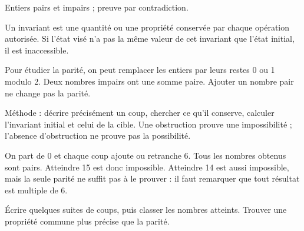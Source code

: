 \documentclass[11pt]{article}
\begin{document}
Entiers pairs et impairs ; preuve par contradiction.\par
{}
Un invariant est une quantité ou une propriété conservée par chaque opération autorisée. Si l’état visé n’a pas la même valeur de cet invariant que l’état initial, il est inaccessible.\par
Pour étudier la parité, on peut remplacer les entiers par leurs restes 0 ou 1 modulo 2. Deux nombres impairs ont une somme paire. Ajouter un nombre pair ne change pas la parité.\par
Méthode : décrire précisément un coup, chercher ce qu’il conserve, calculer l’invariant initial et celui de la cible. Une obstruction prouve une impossibilité ; l’absence d’obstruction ne prouve pas la possibilité.\par
{}
On part de 0 et chaque coup ajoute ou retranche 6. Tous les nombres obtenus sont pairs. Atteindre 15 est donc impossible. Atteindre 14 est aussi impossible, mais la seule parité ne suffit pas à le prouver : il faut remarquer que tout résultat est multiple de 6.\par
{}
Écrire quelques suites de coups, puis classer les nombres atteints. Trouver une propriété commune plus précise que la parité.\par
\end{document}
